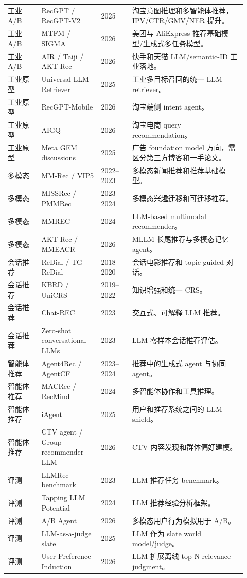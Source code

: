 \documentclass[UTF8,fontset=fandol,11pt]{ctexart}
\begin{document}
\begin{longtable}{@{}p{0.13\linewidth}p{0.23\linewidth}p{0.12\linewidth}p{0.44\linewidth}@{}}
工业 A/B & RecGPT / RecGPT-V2 & 2025 & 淘宝意图推理和多智能体推荐，IPV/CTR/GMV/NER 提升。\\
工业 A/B & MTFM / SIGMA & 2026 & 美团与 AliExpress 推荐基础模型/生成式多任务模型。\\
工业 A/B & AIR / Taiji / AKT-Rec & 2026 & 快手和天猫 LLM/semantic-ID 工业落地。\\
工业原型 & Universal LLM Retriever & 2025 & 工业多目标召回的统一 LLM retriever。\\
工业原型 & RecGPT-Mobile & 2026 & 淘宝端侧 intent agent。\\
工业原型 & AIGQ & 2026 & 淘宝电商 query recommendation。\\
工业原型 & Meta GEM discussions & 2025 & 广告 foundation model 方向，需区分第三方博客和一手论文。\\
多模态 & MM-Rec / VIP5 & 2022--2023 & 多模态新闻推荐和推荐基础模型。\\
多模态 & MISSRec / PMMRec & 2023--2024 & 多模态兴趣迁移和可迁移推荐。\\
多模态 & MMREC & 2024 & LLM-based multimodal recommender。\\
多模态 & AKT-Rec / MMEACR & 2026 & MLLM 长尾推荐与多模态记忆 agent。\\
会话推荐 & ReDial / TG-ReDial & 2018--2020 & 会话电影推荐和 topic-guided 对话。\\
会话推荐 & KBRD / UniCRS & 2019--2022 & 知识增强和统一 CRS。\\
会话推荐 & Chat-REC & 2023 & 交互式、可解释 LLM 推荐。\\
会话推荐 & Zero-shot conversational LLMs & 2023 & LLM 零样本会话推荐评估。\\
智能体推荐 & Agent4Rec / AgentCF & 2023--2024 & 推荐中的生成式 agent 与协同 agent。\\
智能体推荐 & MACRec / RecMind & 2024 & 多智能体协作和工具推理。\\
智能体推荐 & iAgent & 2025 & 用户和推荐系统之间的 LLM shield。\\
智能体推荐 & CTV agent / Group recommender LLM & 2026 & CTV 内容发现和群体偏好建模。\\
评测 & LLMRec benchmark & 2023 & LLM 推荐任务 benchmark。\\
评测 & Tapping LLM Potential & 2024 & LLM 推荐经验分析框架。\\
评测 & A/B Agent & 2026 & 多模态用户行为模拟用于 A/B。\\
评测 & LLM-as-a-judge slate & 2025 & LLM 作为 slate world model/judge。\\
评测 & User Preference Induction & 2026 & LLM 扩展离线 top-N relevance judgment。\\

\end{longtable}
\end{document}
